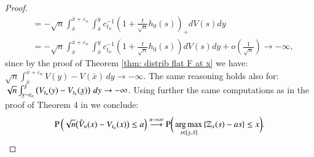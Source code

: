 \begin{proof}
\begin{align*}
    & = -\sqrt{n} \int_{\bar{x}}^{\bar{x}+ \varepsilon_n} \int_{\bar{x}}^y c_{t_n}^{-1}\left(1+\frac{t}{\sqrt{n}} h_0(s)\right)_+ d V(s) d y \\
    & = -\sqrt{n} \int_{\bar{x}}^{\bar{x}+ \varepsilon_n} \int_{\bar{x}}^y c_{t_n}^{-1}\left(1+\frac{t}{\sqrt{n}} h_0(s)\right) d V(s) d y + o\left(\frac{1}{\sqrt{n}} \right)  \rightarrow - \infty,
    \end{align*}
    since by the proof of Theorem \ref{thm: distrib flat F at x} we have: $\sqrt{n}\int_{\bar{x}}^{\bar{x}+ \varepsilon_n} V(y) - V(\bar{x}) \, dy \rightarrow - \infty$. The same reasoning holds also for: $\sqrt{n} \int_{\ubar{x} - \varepsilon_n}^{\ubar{x}} \left( V_{t_n}(y)-V_{t_n}(\ubar{x})\right) \, dy \rightarrow - \infty$. Using further the same computations as in the proof of Theorem 4 in \cite{4} we conclude:
    \begin{align*}
        \pb \left(\sqrt{n} \big( \hat{V}_n (x) - V_{t_n} (x) \big) \leq a \right) \stackrel{n \rightarrow \infty}{\longrightarrow}  \pb \bigg( \argmax_{s \in [\ubar{x},\bar{x}]} \left\{ \mathbb{Z}_x(s) - a s\right\} \leq x \bigg).
    \end{align*}
\end{proof}

\vskip 0.1cm

